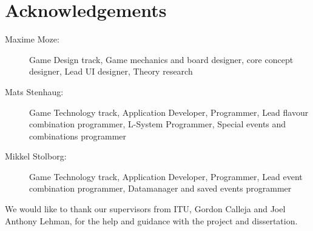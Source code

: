 \chapter{Acknowledgements}
\begin{description}
\item[Maxime Moze:] Game Design track, Game mechanics and board designer, core concept designer, Lead UI designer, Theory research
\item[Mats Stenhaug:] Game Technology track, Application Developer, Programmer, Lead flavour combination programmer, L-System Programmer, Special events and combinations programmer
\item[Mikkel Stolborg:] Game Technology track, Application Developer, Programmer, Lead event combination programmer, Datamanager and saved events programmer
\end{description}
We would like to thank our supervisors from ITU, Gordon Calleja and Joel Anthony Lehman, for the help and guidance with the project and dissertation.